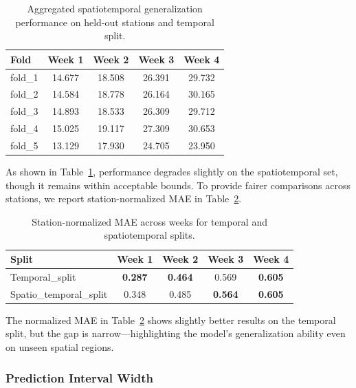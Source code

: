 \documentclass[ruler]{CUP-JNL-EDS}%
\begin{document}
\begin{table}[!htp]
\centering
\begin{tabular}{lcccc}
\hline
\textbf{Fold} & \textbf{Week 1} & \textbf{Week 2} & \textbf{Week 3} & \textbf{Week 4} \\
\hline
fold\_1 & 14.677 & 18.508 & 26.391 & 29.732 \\
fold\_2 & 14.584 & 18.778 & 26.164 & 30.165 \\
fold\_3 & 14.893 & 18.533 & 26.309 & 29.712 \\
fold\_4 & 15.025 & 19.117 & 27.309 & 30.653 \\
fold\_5 & 13.129 & 17.930 & 24.705 & 23.950 \\
\hline
\end{tabular}
\caption{Aggregated spatiotemporal generalization performance on held-out stations and temporal split.}
\label{tab:spatiotemporal_generalization_aggregated}
\end{table}

\noindent As shown in Table~\ref{tab:spatiotemporal_generalization_aggregated}, performance degrades slightly on the spatiotemporal set, though it remains within acceptable bounds. To provide fairer comparisons across stations, we report station-normalized MAE in Table~\ref{tab:spatiotemporal_generalization}.

\begin{table}[!htp]
\centering
\begin{tabular}{lcccc}
\hline
\textbf{Split} & \textbf{Week 1} & \textbf{Week 2} & \textbf{Week 3} & \textbf{Week 4} \\
\hline
Temporal\_split & \textbf{0.287} & \textbf{0.464} & 0.569 & \textbf{0.605} \\
Spatio\_temporal\_split & 0.348 & 0.485 & \textbf{0.564} & \textbf{0.605} \\
\hline
\end{tabular}
\caption{Station-normalized MAE across weeks for temporal and spatiotemporal splits.}
\label{tab:spatiotemporal_generalization}
\end{table}

\noindent The normalized MAE in Table~\ref{tab:spatiotemporal_generalization} shows slightly better results on the temporal split, but the gap is narrow—highlighting the model’s generalization ability even on unseen spatial regions.

\subsubsection*{Prediction Interval Width}
\end{document}
